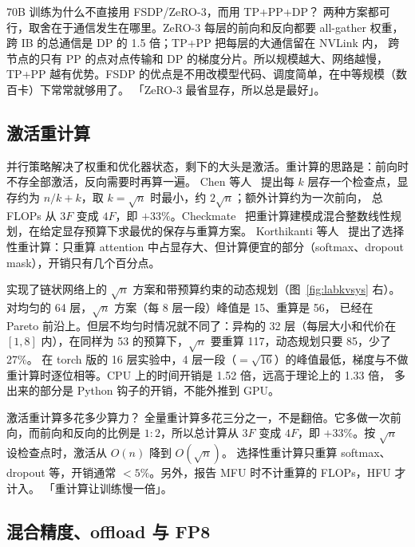 \begin{qa}{70B 训练为什么不直接用 FSDP/ZeRO-3，而用 TP+PP+DP？}
\ans 两种方案都可行，取舍在于通信发生在哪里。ZeRO-3 每层的前向和反向都要 all-gather 权重，跨 IB 的总通信是 DP 的 1.5 倍；TP+PP 把每层的大通信留在 NVLink 内，
跨节点的只有 PP 的点对点传输和 DP 的梯度分片。所以规模越大、网络越慢，TP+PP 越有优势。FSDP 的优点是不用改模型代码、调度简单，在中等规模（数百卡）下常常就够用了。
\wrong 「ZeRO-3 最省显存，所以总是最好」。
\end{qa}

\subsection{激活重计算}

并行策略解决了权重和优化器状态，剩下的大头是激活。重计算的思路是：前向时不存全部激活，反向需要时再算一遍。
Chen 等人~\cite{chen2016training} 提出每 $k$ 层存一个检查点，显存约为 $n/k+k$，取 $k=\sqrt{n}$ 时最小，约 $2\sqrt{n}$；额外计算约为一次前向，
总 FLOPs 从 $3F$ 变成 $4F$，即 $+33\%$。Checkmate~\cite{jain2020checkmate} 把重计算建模成混合整数线性规划，在给定显存预算下求最优的保存与重算方案。
Korthikanti 等人~\cite{korthikanti2023reducing} 提出了选择性重计算：只重算 attention 中占显存大、但计算便宜的部分（softmax、dropout mask），开销只有几个百分点。

实现了链状网络上的 $\sqrt{n}$ 方案和带预算约束的动态规划（图~\ref{fig:labkvsys} 右）。对均匀的 64 层，$\sqrt{n}$ 方案（每 8 层一段）峰值是 15、重算是 56，
已经在 Pareto 前沿上。但层不均匀时情况就不同了：异构的 32 层（每层大小和代价在 $[1,8]$ 内），在同样为 53 的预算下，$\sqrt{n}$ 要重算 117，动态规划只要 85，少了 27\%。
在 torch 版的 16 层实验中，4 层一段（$=\sqrt{16}$）的峰值最低，梯度与不做重计算时逐位相等。CPU 上的时间开销是 1.52 倍，远高于理论上的 1.33 倍，
多出来的部分是 Python 钩子的开销，不能外推到 GPU。

\begin{qa}{激活重计算多花多少算力？}
\ans 全量重计算多花三分之一，不是翻倍。它多做一次前向，而前向和反向的比例是 $1:2$，所以总计算从 $3F$ 变成 $4F$，即 $+33\%$。按 $\sqrt{n}$ 设检查点时，激活从 $O(n)$ 降到 $O(\sqrt{n})$。
选择性重计算只重算 softmax、dropout 等，开销通常 $<5\%$。另外，报告 MFU 时不计重算的 FLOPs，HFU 才计入。
\wrong 「重计算让训练慢一倍」。
\end{qa}

\subsection{混合精度、offload 与 FP8}

